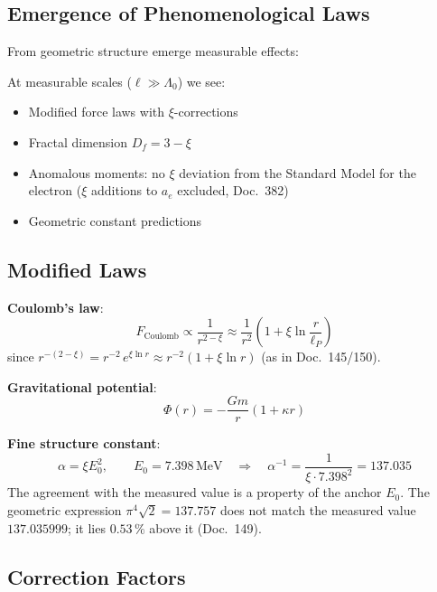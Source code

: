 	\subsection{Emergence of Phenomenological Laws}
	
	From geometric structure emerge measurable effects:
	
	\begin{keyresult}
		At measurable scales ($\ell \gg \Lambda_0$) we see:
		
		\begin{itemize}
			\item Modified force laws with $\xi$-corrections
			\item Fractal dimension $D_f = 3-\xi$
			\item Anomalous moments: no $\xi$ deviation from the Standard Model for the electron ($\xi$ additions to $a_e$ excluded, Doc.~382)
			\item Geometric constant predictions
		\end{itemize}
	\end{keyresult}
	
	\subsection{Modified Laws}
	
	\textbf{Coulomb's law}:
	\begin{equation}
		F_{\text{Coulomb}} \propto \frac{1}{r^{2-\xi}} \approx \frac{1}{r^2} \left(1 + \xi \ln\frac{r}{\ell_P}\right)
	\end{equation}
	since $r^{-(2-\xi)} = r^{-2}\,e^{\xi \ln r} \approx r^{-2}(1 + \xi \ln r)$ (as in Doc.~145/150).
	
	\textbf{Gravitational potential}:
	\begin{equation}
		\Phi(r) = -\frac{Gm}{r}(1 + \kappa r)
	\end{equation}
	
	\textbf{Fine structure constant}:
	\begin{equation}
		\alpha = \xi E_0^2, \qquad E_0 = 7.398\,\text{MeV} \quad \Rightarrow \quad \alpha^{-1} = \frac{1}{\xi \cdot 7.398^2} = 137.035
	\end{equation}
	The agreement with the measured value is a property of the anchor $E_0$. The geometric expression $\pi^4\sqrt{2} = 137.757$ does not match the measured value $137.035999$; it lies $0.53\,\%$ above it (Doc.~149).
	
	\subsection{Correction Factors}
	
